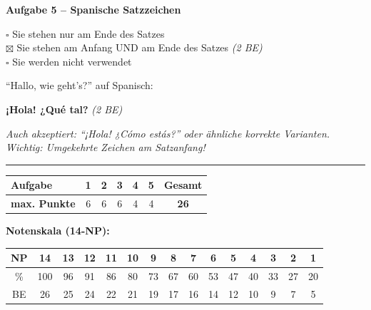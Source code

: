 \documentclass[11pt, a4paper]{article}
\newcommand{\punktebox}[1]{\hfill\fbox{\small \_\_\_/#1}}
\newcommand{\lsg}[1]{\textcolor{loesung}{\textbf{#1}}}
\begin{document}
\vspace{15pt}


\noindent\textbf{\textcolor{spanisch}{Aufgabe 5 -- Spanische Satzzeichen}} \punktebox{4}

\vspace{10pt}

\noindent
$\square$ Sie stehen nur am Ende des Satzes \\
\lsg{$\boxtimes$} Sie stehen am Anfang UND am Ende des Satzes \hfill \textit{(2 BE)} \\
$\square$ Sie werden nicht verwendet

\vspace{10pt}

\noindent ``Hallo, wie geht's?'' auf Spanisch:

\vspace{5pt}

\noindent \lsg{¡Hola! ¿Qué tal?} \hfill \textit{(2 BE)}

\vspace{5pt}
\textit{Auch akzeptiert: ``¡Hola! ¿Cómo estás?'' oder ähnliche korrekte Varianten. Wichtig: Umgekehrte Zeichen am Satzanfang!}


\vspace{20pt}
\hrule
\vspace{10pt}

\noindent
\begin{tabularx}{\textwidth}{|X|c|c|c|c|c||c|}
\hline
\textbf{Aufgabe} & 1 & 2 & 3 & 4 & 5 & \textbf{Gesamt} \\
\hline
\textbf{max. Punkte} & 6 & 6 & 6 & 4 & 4 & \textbf{26} \\
\hline
\end{tabularx}

\vspace{15pt}

\noindent\textbf{Notenskala (14-NP):}

\vspace{5pt}

\begin{tabular}{|c|c|c|c|c|c|c|c|c|c|c|c|c|c|c|}
\hline
NP & 14 & 13 & 12 & 11 & 10 & 9 & 8 & 7 & 6 & 5 & 4 & 3 & 2 & 1 \\
\hline
\% & 100 & 96 & 91 & 86 & 80 & 73 & 67 & 60 & 53 & 47 & 40 & 33 & 27 & 20 \\
\hline
BE & 26 & 25 & 24 & 22 & 21 & 19 & 17 & 16 & 14 & 12 & 10 & 9 & 7 & 5 \\
\hline
\end{tabular}
\end{document}
